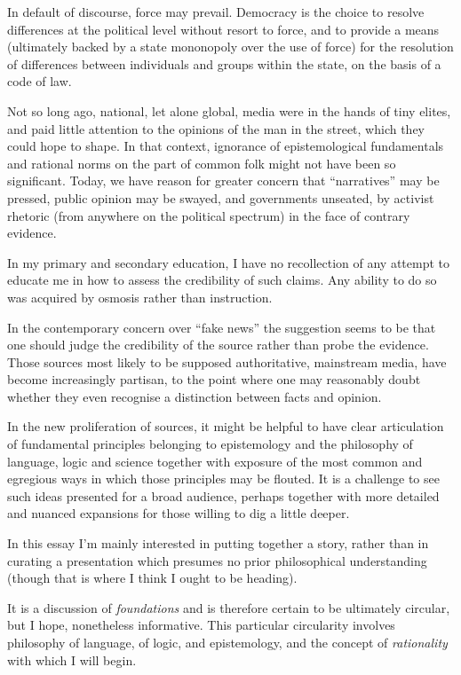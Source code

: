 \documentclass[10pt,titlepage]{book}
\begin{document}
In default of discourse, force may prevail.
Democracy is the choice to resolve differences at the political level without resort to force, and to provide a means (ultimately backed by a state mononopoly over the use of force) for the resolution of differences between individuals and groups within the state, on the basis of a code of law.

Not so long ago, national, let alone global, media were in the hands of tiny elites, and paid little attention to the opinions of the man in the street, which they could hope to shape.
In that context, ignorance of epistemological fundamentals and rational norms on the part of common folk might not have been so significant.
Today, we have reason for greater concern that ``narratives'' may be pressed, public opinion may be swayed, and governments unseated, by activist rhetoric (from anywhere on the political spectrum) in the face of contrary evidence.

In my primary and secondary education, I have no recollection of any attempt to educate me in how to assess the credibility of such claims.
Any ability to do so was acquired by osmosis rather than instruction.

In the contemporary concern over ``fake news'' the suggestion seems to be that one should judge the credibility of the source rather than probe the evidence.
Those sources most likely to be supposed authoritative, mainstream media, have become increasingly partisan, to the point where one may reasonably doubt whether they even recognise a distinction between facts and opinion.

In the new proliferation of sources, it might be helpful to have clear articulation of fundamental principles belonging to epistemology and the philosophy of language, logic and science together with exposure of the most common and egregious ways in which those principles may be flouted.
It is a challenge to see such ideas presented for a broad audience, perhaps together with more detailed and nuanced expansions for those willing to dig a little deeper.

In this essay I'm mainly interested in putting together a story, rather than in curating a presentation which presumes no prior philosophical understanding (though that is where I think I ought to be heading).

It is a discussion of \emph{foundations} and is therefore certain to be ultimately circular, but I hope, nonetheless informative.
This particular circularity involves philosophy of language, of logic, and epistemology, and the concept of \emph{rationality} with which I will begin.
\end{document}
